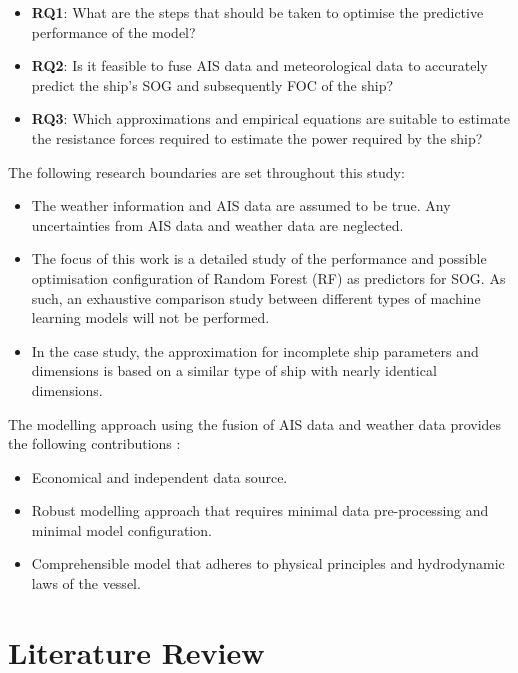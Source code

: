 \documentclass[]{interact}
\theoremstyle{plain}%
\theoremstyle{definition}
\theoremstyle{remark}
\begin{document}
\begin{itemize}
    \item \textbf{RQ1}: What are the steps that should be taken to optimise the predictive performance of the model?
    \item \textbf{RQ2}: Is it feasible to fuse AIS data and meteorological data to accurately predict the ship's SOG and subsequently FOC of the ship?
    \item \textbf{RQ3}: Which approximations and empirical equations are suitable to estimate the resistance forces required to estimate the power required by the ship? 
\end{itemize} 

The following research boundaries are set throughout this study:

\begin{itemize}
    \item The weather information and AIS data are assumed to be true. Any uncertainties from AIS data and weather data are neglected. 
    \item The focus of this work is a detailed study of the performance and possible optimisation configuration of Random Forest (RF) as predictors for SOG. As such, an exhaustive comparison study between different types of machine learning models will not be performed.
    \item In the case study, the approximation for incomplete ship parameters and dimensions is based on a similar type of ship with nearly identical dimensions. 
\end{itemize}

The modelling approach using the fusion of AIS data and weather data provides the following contributions : 

\begin{itemize}
    \item Economical and independent data source.
    \item Robust modelling approach that requires minimal data pre-processing and minimal model configuration.
    \item Comprehensible model that adheres to physical principles and hydrodynamic laws of the vessel.  
\end{itemize} 


\section{Literature Review}\label{sec:literature_review}
\end{document}
